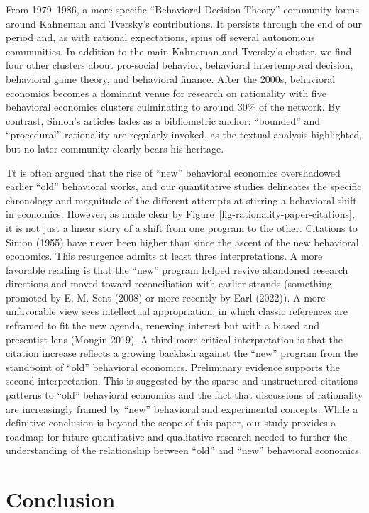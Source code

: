 \documentclass[
]{interact}
\begin{document}
From 1979--1986, a more specific ``Behavioral Decision Theory''
community forms around Kahneman and Tversky's contributions. It persists
through the end of our period and, as with rational expectations, spins
off several autonomous communities. In addition to the main Kahneman and
Tversky's cluster, we find four other clusters about pro-social
behavior, behavioral intertemporal decision, behavioral game theory, and
behavioral finance. After the 2000s, behavioral economics becomes a
dominant venue for research on rationality with five behavioral
economics clusters culminating to around 30\% of the network. By
contrast, Simon's articles fades as a bibliometric anchor: ``bounded''
and ``procedural'' rationality are regularly invoked, as the textual
analysis highlighted, but no later community clearly bears his heritage.

Tt is often argued that the rise of ``new'' behavioral economics
overshadowed earlier ``old'' behavioral works, and our quantitative
studies delineates the specific chronology and magnitude of the
different attempts at stirring a behavioral shift in economics. However,
as made clear by Figure~\ref{fig-rationality-paper-citations}, it is not
just a linear story of a shift from one program to the other. Citations
to Simon (1955) have never been higher than since the ascent of the new
behavioral economics. This resurgence admits at least three
interpretations. A more favorable reading is that the ``new'' program
helped revive abandoned research directions and moved toward
reconciliation with earlier strands (something promoted by E.-M. Sent
(2008) or more recently by Earl (2022)). A more unfavorable view sees
intellectual appropriation, in which classic references are reframed to
fit the new agenda, renewing interest but with a biased and presentist
lens (Mongin 2019). A third more critical interpretation is that the
citation increase reflects a growing backlash against the ``new''
program from the standpoint of ``old'' behavioral economics. Preliminary
evidence supports the second interpretation. This is suggested by the
sparse and unstructured citations patterns to ``old'' behavioral
economics and the fact that discussions of rationality are increasingly
framed by ``new'' behavioral and experimental concepts. While a
definitive conclusion is beyond the scope of this paper, our study
provides a roadmap for future quantitative and qualitative research
needed to further the understanding of the relationship between ``old''
and ``new'' behavioral economics.

\section{\texorpdfstring{\textbf{Conclusion}}{Conclusion}}\label{conclusion}
\end{document}
